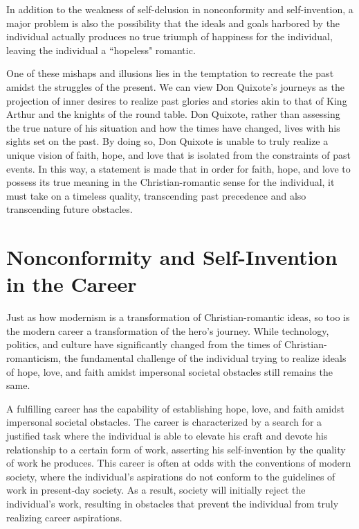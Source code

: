 \documentclass[12pt,letterpaper]{article}
\begin{document}
In addition to the weakness of self-delusion in nonconformity and self-invention, a major problem is also the possibility that the ideals and goals harbored by the individual actually produces no true triumph of happiness for the individual, leaving the individual a ``hopeless" romantic.  

One of these mishaps and illusions lies in the temptation to recreate the past amidst the struggles of the present.  We can view Don Quixote's journeys as the projection of inner desires to realize past glories and stories akin to that of King Arthur and the knights of the round table.   Don Quixote, rather than assessing the true nature of his situation and how the times have changed, lives with his sights set on the past.  By doing so, Don Quixote is unable to truly realize a unique vision of faith, hope, and love that is isolated from the constraints of past events.  In this way, a statement is made that in order for faith, hope, and love to possess its true meaning in the Christian-romantic sense for the individual, it must take on a timeless quality, transcending past precedence and also transcending future obstacles.


\section{Nonconformity and Self-Invention in the Career}

Just as how modernism is a transformation of Christian-romantic ideas, so too is the modern career a transformation of the hero's journey.  While technology, politics, and culture have significantly changed from the times of Christian-romanticism, the fundamental challenge of the individual trying to realize ideals of hope, love, and faith amidst impersonal societal obstacles still remains the same.  

A fulfilling career has the capability of establishing hope, love, and faith amidst impersonal societal obstacles.  The career is characterized by a search for a justified task where the individual is able to elevate his craft and devote his relationship to a certain form of work, asserting his self-invention by the quality of work he produces.  This career is often at odds with the conventions of modern society, where the individual's aspirations do not conform to the guidelines of work in present-day society.  As a result, society will initially reject the individual's work, resulting in obstacles that prevent the individual from truly realizing career aspirations.
\end{document}
